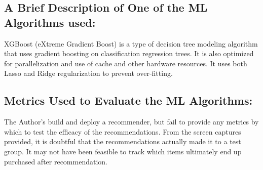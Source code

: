\documentclass[]{article}
\begin{document}
\subsection*{A Brief Description of One of the ML Algorithms used:}
 XGBoost (eXtreme Gradient Boost) is a type of decision tree modeling algorithm that uses gradient boosting on classification regression trees. It is also optimized for parallelization and use of cache and other hardware resources. It uses both Lasso and Ridge regularization to prevent over-fitting. 

\subsection*{Metrics Used to Evaluate the ML Algorithms:}
The Author's build and deploy a recommender, but fail to provide any metrics by which to test the efficacy of the recommendations. From the screen captures provided, it is doubtful that the recommendations actually made it to a test group. It may not have been feasible to track which items ultimately end up purchased after recommendation.
\end{document}
